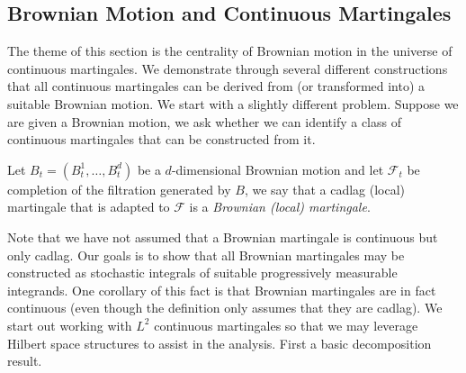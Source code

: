\subsection{Brownian Motion and Continuous Martingales}

The theme of this section is the centrality of Brownian motion in the universe of continuous martingales.  We demonstrate through several different constructions that all continuous martingales can be derived from (or transformed into) a suitable Brownian motion.  We start with a slightly different problem.  Suppose we are given a Brownian motion, we ask whether we can identify a class of continuous martingales that can be constructed from it.

\begin{defn}Let $B_t=(B^1_t, \dotsc, B^d_t)$ be a $d$-dimensional Brownian motion and let $\mathcal{F}_t$ be completion of the filtration generated by $B$, we say that a cadlag (local) martingale that is adapted to $\mathcal{F}$ is a \emph{Brownian (local) martingale}.
\end{defn}

Note that we have not assumed that a Brownian martingale is continuous but only cadlag.  Our goals is to show that all Brownian martingales may be constructed as stochastic integrals of suitable progressively measurable integrands.  One corollary of this fact is that Brownian martingales are in fact continuous (even though the definition only assumes that they are cadlag).  We start out working with $L^2$ continuous martingales so that we may leverage Hilbert space structures to assist in the analysis.  First a basic decomposition result.


